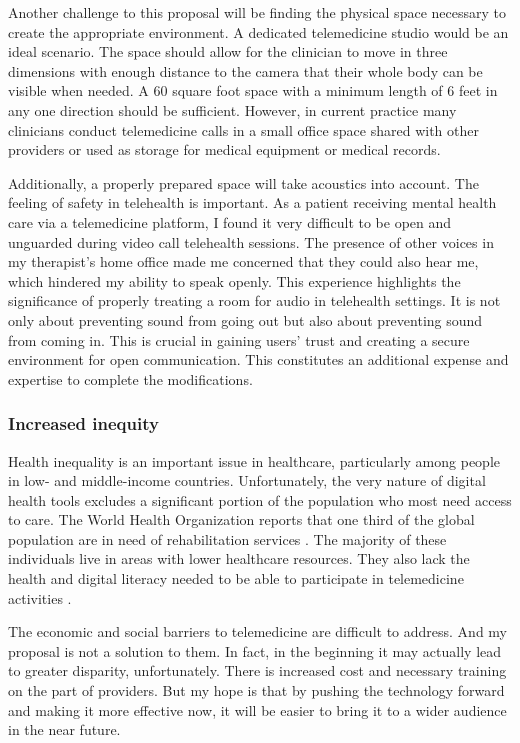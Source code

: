 \documentclass[utf8]{FrontiersinHarvard} %
\begin{document}
Another challenge to this proposal will be finding the physical space necessary to create the appropriate environment. A dedicated telemedicine studio would be an ideal scenario. The space should allow for the clinician to move in three dimensions with enough distance to the camera that their whole body can be visible when needed. A 60 square foot space with a minimum length of 6 feet in any one direction should be sufficient. However, in current practice many clinicians conduct telemedicine calls in a small office space shared with other providers or used as storage for medical equipment or medical records.

Additionally, a properly prepared space will take acoustics into account. The feeling of safety in telehealth is important. As a patient receiving mental health care via a telemedicine platform, I found it very difficult to be open and unguarded during video call telehealth sessions. The presence of other voices in my therapist's home office made me concerned that they could also hear me, which hindered my ability to speak openly. This experience highlights the significance of properly treating a room for audio in telehealth settings. It is not only about preventing sound from going out but also about preventing sound from coming in. This is crucial in gaining users' trust and creating a secure environment for open communication. This constitutes an additional expense and expertise to complete the modifications.

\subsubsection{Increased inequity}

Health inequality is an important issue in healthcare, particularly among people in low- and middle-income countries. Unfortunately, the very nature of digital health tools excludes a significant portion of the population who most need access to care. The World Health Organization reports that one third of the global population are in need of rehabilitation services \citep{Gimigliano2017World}. The majority of these individuals live in areas with lower healthcare resources. They also lack the health and digital literacy needed to be able to participate in telemedicine activities \citep{fernandesWhatExtentCan2021}.

The economic and social barriers to telemedicine are difficult to address. And my proposal is not a solution to them. In fact, in the beginning it may actually lead to greater disparity, unfortunately. There is increased cost and necessary training on the part of providers. But my hope is that by pushing the technology forward and making it more effective now, it will be easier to bring it to a wider audience in the near future.
\end{document}
